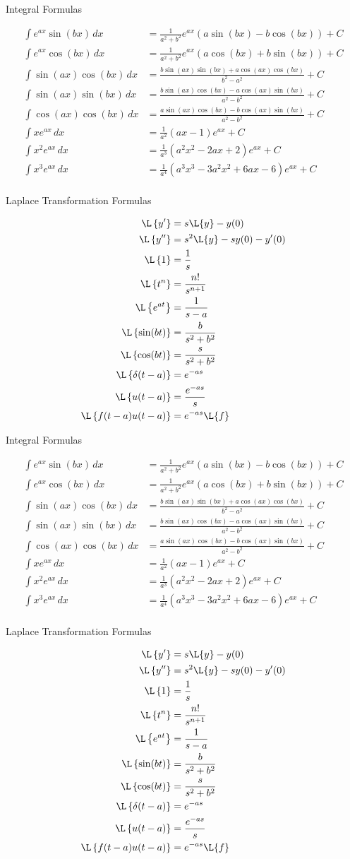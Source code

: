\documentclass{article}
\newcommand{\tablePage}{
\begin{center}\Huge Integral Formulas\end{center}
\begin{align*}
\int e^{ax}\sin(bx) \,dx &= \frac{1}{a^2+b^2} e^{a x} \left(a \sin(bx) - b\cos(bx)\right)+C \\
\int e^{ax}\cos(bx) \,dx &= \frac{1}{a^2+b^2} e^{a x} \left(a \cos(bx) + b\sin(bx)\right)+C \\
\int \sin(a x) \cos(b x) \,dx &= \frac{b \sin(a x) \sin(b x) + a \cos(a x) \cos(b x)}{b^2 - a^2} + C \\
\int \sin(a x) \sin(b x) \,dx &= \frac{b \sin(a x) \cos(b x) - a \cos(a x) \sin(b x)}{a^2 - b^2} + C \\
\int  \cos(a x) \cos(b x) \,dx &= \frac{a \sin(a x) \cos(b x) - b \cos(a x) \sin(b x)}{a^2 - b^2} + C \\
\int xe^{ax} \,dx &= \frac{1}{a^2}(ax-1)e^{ax}+C \\
\int x^2e^{ax} \,dx &= \frac{1}{a^3}(a^2x^2-2ax+2)e^{ax}+C \\
\int x^3e^{ax} \,dx &= \frac{1}{a^4}(a^3x^3-3a^2x^2+6ax-6)e^{ax}+C \\
\end{align*}

\vfill

\begin{center}\Huge Laplace Transformation Formulas\end{center}
\begin{align*}
\L\left\{y'\right\} &= s\L\{y\}-y(0) \\
\L\left\{y''\right\} &= s^2\L\{y\}-sy(0)-y'(0) \\
\L\left\{1\right\} &= \frac{1}{s} \\
\L\left\{t^n\right\} &= \frac{n!}{s^{n+1}} \\
\L\left\{e^{at}\right\} &= \frac{1}{s-a} \\
\L\left\{ \sin(bt) \right\} &= \frac{b}{s^2+b^2}  \\ 
\L\left\{ \cos(bt) \right\} &= \frac{s}{s^2+b^2}\\ 
\L\left\{ \delta(t-a) \right\} &= e^{-as}  \\ 
\L\left\{ u(t-a)\right\} &= \frac{e^{-as}}{s} \\ 
\L\left\{ f(t-a)u(t-a)\right\} &= e^{-as} \L\{f\} \\ 
\end{align*}
}
\begin{document}
\large
\tablePage

\newpage

\tablePage
\end{document}
